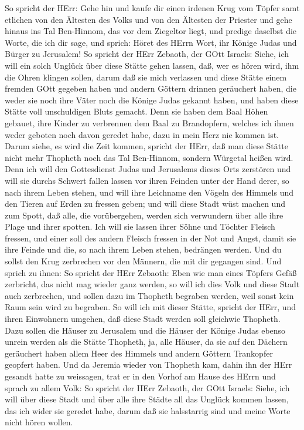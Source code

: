  So spricht der HErr: Gehe hin und kaufe dir einen irdenen
Krug vom Töpfer samt etlichen von den Ältesten des Volks und von den
Ältesten der Priester  und gehe hinaus ins Tal Ben-Hinnom,
das vor dem Ziegeltor liegt, und predige daselbst die Worte, die ich dir
sage,  und sprich: Höret des HErrn Wort, ihr Könige Judas
und Bürger zu Jerusalem! So spricht der HErr Zebaoth, der GOtt Israels:
Siehe, ich will ein solch Unglück über diese Stätte gehen lassen, daß,
wer es hören wird, ihm die Ohren klingen sollen,  darum daß
sie mich verlassen und diese Stätte einem fremden GOtt gegeben haben und
andern Göttern drinnen geräuchert haben, die weder sie noch ihre Väter
noch die Könige Judas gekannt haben, und haben diese Stätte voll
unschuldigen Bluts gemacht.  Denn sie haben dem Baal Höhen
gebauet, ihre Kinder zu verbrennen dem Baal zu Brandopfern, welches ich
ihnen weder geboten noch davon geredet habe, dazu in mein Herz nie
kommen ist.  Darum siehe, es wird die Zeit kommen, spricht
der HErr, daß man diese Stätte nicht mehr Thopheth noch das Tal
Ben-Hinnom, sondern Würgetal heißen wird.  Denn ich will den
Gottesdienst Judas und Jerusalems dieses Orts zerstören und will sie
durchs Schwert fallen lassen vor ihren Feinden unter der Hand derer, so
nach ihrem Leben stehen, und will ihre Leichname den Vögeln des Himmels
und den Tieren auf Erden zu fressen geben;  und will diese
Stadt wüst machen und zum Spott, daß alle, die vorübergehen, werden sich
verwundern über alle ihre Plage und ihrer spotten.  Ich will
sie lassen ihrer Söhne und Töchter Fleisch fressen, und einer soll des
andern Fleisch fressen in der Not und Angst, damit sie ihre Feinde und
die, so nach ihrem Leben stehen, bedrängen werden.  Und du
sollst den Krug zerbrechen vor den Männern, die mit dir gegangen sind.
 Und sprich zu ihnen: So spricht der HErr Zebaoth: Eben wie
man eines Töpfers Gefäß zerbricht, das nicht mag wieder ganz werden, so
will ich dies Volk und diese Stadt auch zerbrechen, und sollen dazu im
Thopheth begraben werden, weil sonst kein Raum sein wird zu begraben.
 So will ich mit dieser Stätte, spricht der HErr, und ihren
Einwohnern umgehen, daß diese Stadt werden soll gleichwie Thopheth.
 Dazu sollen die Häuser zu Jerusalem und die Häuser der
Könige Judas ebenso unrein werden als die Stätte Thopheth, ja, alle
Häuser, da sie auf den Dächern geräuchert haben allem Heer des Himmels
und andern Göttern Trankopfer geopfert haben.  Und da
Jeremia wieder von Thopheth kam, dahin ihn der HErr gesandt hatte zu
weissagen, trat er in den Vorhof am Hause des HErrn und sprach zu allem
Volk:  So spricht der HErr Zebaoth, der GOtt Israels:
Siehe, ich will über diese Stadt und über alle ihre Städte all das
Unglück kommen lassen, das ich wider sie geredet habe, darum daß sie
halsstarrig sind und meine Worte nicht hören wollen.


